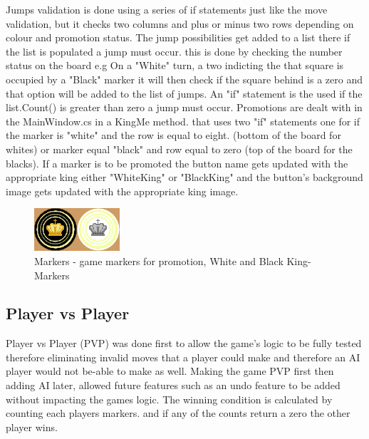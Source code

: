 \documentclass[10pt, a4paper]{article}
\begin{document}
	
Jumps validation is done using a series of if statements just like the move validation, but it checks two columns and plus or minus two rows depending on colour and promotion status. The jump possibilities get added to a list there if the list is populated a jump must occur.  
this is done by checking the number status on the board e.g On a "White" turn, a two indicting the that square is occupied by a "Black" marker it will then check if the square behind is a zero and that option will be added to the list of jumps. An "if" statement is the used if the list.Count() is greater than zero a jump must occur.  
Promotions are dealt with in the MainWindow.cs in a KingMe method. that uses two "if" statements one for if the marker is "white" and the row is equal to eight. (bottom of the board for whites) or marker equal "black" and row equal to zero (top of the board for the blacks). If a marker is to be promoted the button name gets updated with the appropriate king either "WhiteKing" or "BlackKing" and the button's background image gets updated with the appropriate king image.
\begin{figure}[H]
  	\centering
  	\includegraphics[scale = 1.25]{KingMarkers}
	\caption{Markers - game markers for promotion, White and Black King-Markers}
  	\label{fig:nonfloat}
	\end{figure} 
	\subsection{Player vs Player}
	Player vs Player (PVP) was done first to allow the game's logic to be fully tested therefore eliminating invalid moves that a player could make and therefore an AI player would not be-able to make as well. Making the game PVP first then adding AI later, allowed future features such as an undo feature to be added without impacting the games logic.  The winning condition is calculated by counting each players markers. and if any of the counts return a zero the other player wins.
	
\end{document}
